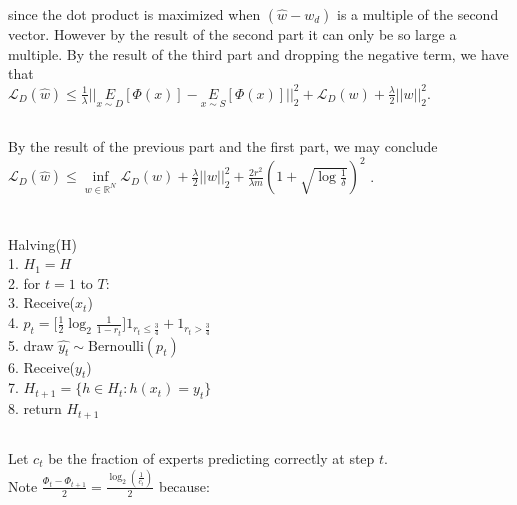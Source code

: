 \documentclass[]{article}
\begin{document}
\noindent since the dot product is maximized when $(\hat{w} -w_d)$ is a multiple of the second vector. However by the result of the second part it can only be so large a multiple. By the result of the third part and dropping the negative term, we have that\\

$\mathcal{L}_D({\hat{w}}) \le \frac{1}{\lambda}\vert \vert \underset{x \sim D}{E}[\Phi(x)] - \underset{x \sim S}{E}[\Phi(x)]\vert \vert_2^2 + \mathcal{L}_D(w) + \frac{\lambda}{2}\vert \vert w \vert \vert_2^2$.
 
\subsection{}

By the result of the previous part and the first part, we may conclude\\

$\mathcal{L}_D({\hat{w}}) \le \underset{w \in \mathbb{R}^N}{\inf} \mathcal{L}_D(w) + \frac{\lambda}{2}\vert \vert w \vert \vert_2^2 + \frac{2r^2}{\lambda m}(1+\sqrt{\log \frac{1}{\delta}})^2$ .


\pagebreak

\section{}
\subsection{}
Halving(H)\\
1. $ H_1 = H$\\
2. for $t = 1$ to $T$:\\
3. \indent Receive($x_t$)\\
4. \indent $p_t = \lbrack \frac{1}{2} \log_2 \frac{1}{1-r_t}\rbrack 1_{r_t \le \frac{3}{4}} + 1_{r_t > \frac{3}{4}}$\\
5. \indent draw $\hat{y_t} \sim \text{Bernoulli}(p_t)$\\
6. \indent Receive($y_t$)\\
7. \indent $H_{t+1} = \lbrace {h \in H_t : h(x_t) = y_t} \rbrace $\\
8. return $H_{t+1}$

\subsection{}

Let $c_t$ be the fraction of experts predicting correctly at step $t$.\\
Note $\frac{\Phi_t - \Phi_{t+1}}{2} = \frac{\log_2(\frac{1}{c_t})}{2}$ because:\\
\end{document}
